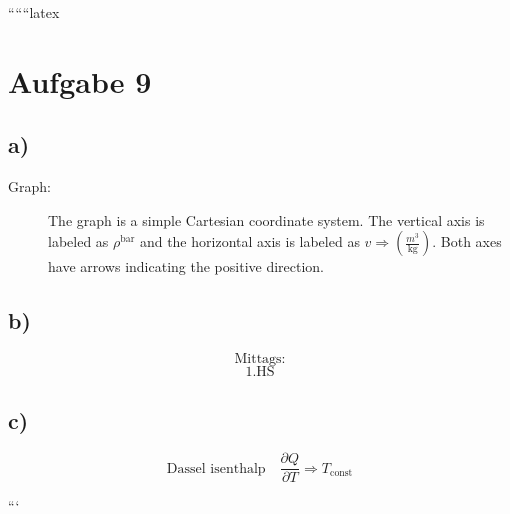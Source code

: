 
``````latex


\section*{Aufgabe 9}

\subsection*{a)}
\begin{description}
    \item[Graph:] The graph is a simple Cartesian coordinate system. The vertical axis is labeled as $\rho^{\text{bar}}$ and the horizontal axis is labeled as $v \Rightarrow \left( \frac{m^3}{\text{kg}} \right)$. Both axes have arrows indicating the positive direction.
\end{description}

\subsection*{b)}
\[
\text{Mittags:}
\]
\[
1. \text{HS}
\]

\subsection*{c)}
\[
\text{Dassel isenthalp} \quad \frac{\partial Q}{\partial T} \Rightarrow T_{\text{const}}
\]

```